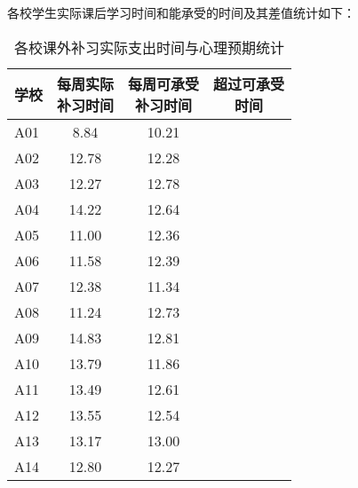 \documentclass[cn, 11pt, fancy, hide]{elegantbook}
\begin{document}
各校学生实际课后学习时间和能承受的时间及其差值统计如下：

\begin{table}[!h]

\caption{\label{tab:unnamed-chunk-66}各校课外补习实际支出时间与心理预期统计}
\centering
\fontsize{12}{14}\selectfont
\begin{tabular}{lccc}
\toprule
学校 & \makecell[c]{每周实际 \\ 补习时间} & \makecell[c]{每周可承受 \\ 补习时间} & \makecell[c]{超过可承受 \\ 时间}\\
\midrule
\rowcolor{gray!6}  A01 & 8.84 & 10.21 & \multicolumn{1}{r}{\cellcolor[HTML]{F3C57B}{\textcolor{black}{-1.37}}}\\
A02 & 12.78 & 12.28 & \multicolumn{1}{r}{\cellcolor[HTML]{db735c}{\textcolor{black}{0.5}}}\\
\rowcolor{gray!6}  A03 & 12.27 & 12.78 & \multicolumn{1}{r}{\cellcolor[HTML]{F3C57B}{\textcolor{black}{-0.51}}}\\
A04 & 14.22 & 12.64 & \multicolumn{1}{r}{\cellcolor[HTML]{db735c}{\textcolor{black}{1.58}}}\\
\rowcolor{gray!6}  A05 & 11.00 & 12.36 & \multicolumn{1}{r}{\cellcolor[HTML]{F3C57B}{\textcolor{black}{-1.36}}}\\
A06 & 11.58 & 12.39 & \multicolumn{1}{r}{\cellcolor[HTML]{F3C57B}{\textcolor{black}{-0.81}}}\\
\rowcolor{gray!6}  A07 & 12.38 & 11.34 & \multicolumn{1}{r}{\cellcolor[HTML]{db735c}{\textcolor{black}{1.04}}}\\
A08 & 11.24 & 12.73 & \multicolumn{1}{r}{\cellcolor[HTML]{F3C57B}{\textcolor{black}{-1.49}}}\\
\rowcolor{gray!6}  A09 & 14.83 & 12.81 & \multicolumn{1}{r}{\cellcolor[HTML]{db735c}{\textcolor{black}{2.02}}}\\
A10 & 13.79 & 11.86 & \multicolumn{1}{r}{\cellcolor[HTML]{db735c}{\textcolor{black}{1.93}}}\\
\rowcolor{gray!6}  A11 & 13.49 & 12.61 & \multicolumn{1}{r}{\cellcolor[HTML]{db735c}{\textcolor{black}{0.89}}}\\
A12 & 13.55 & 12.54 & \multicolumn{1}{r}{\cellcolor[HTML]{db735c}{\textcolor{black}{1.01}}}\\
\rowcolor{gray!6}  A13 & 13.17 & 13.00 & \multicolumn{1}{r}{\cellcolor[HTML]{db735c}{\textcolor{black}{0.16}}}\\
A14 & 12.80 & 12.27 & \multicolumn{1}{r}{\cellcolor[HTML]{db735c}{\textcolor{black}{0.53}}}\\

\end{tabular}
\end{table}
\end{document}
